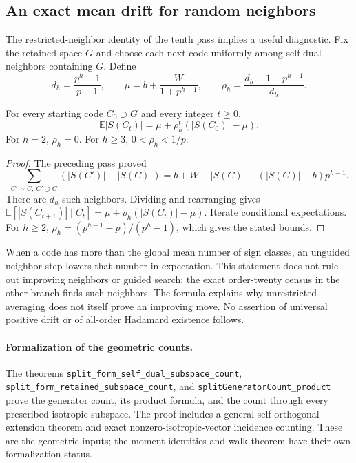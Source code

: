 \subsection{An exact mean drift for random neighbors}
The restricted-neighbor identity of the tenth pass implies a useful
diagnostic. Fix the retained space $G$ and choose each next code
uniformly among self-dual neighbors containing $G$. Define
\[
 d_h=\frac{p^h-1}{p-1},\qquad
 \mu=b+\frac{W}{1+p^{h-1}},\qquad
 \rho_h=\frac{d_h-1-p^{h-1}}{d_h}.
\]
\begin{proposition}
For every starting code $C_0\supset G$ and every integer $t\ge0$,
\[
 \mathbb E |S(C_t)|=\mu+\rho_h^t(|S(C_0)|-\mu).
\]
For $h=2$, $\rho_h=0$. For $h\ge3$, $0<\rho_h<1/p$.
\end{proposition}
\begin{proof}
The preceding pass proved
\[
 \sum_{C'\sim C,\ C'\supset G}(|S(C')|-|S(C)|)
 =b+W-|S(C)|-(|S(C)|-b)p^{h-1}.
\]
There are $d_h$ such neighbors. Dividing and rearranging gives
$\mathbb E[|S(C_{t+1})|\mid C_t]
=\mu+\rho_h(|S(C_t)|-\mu)$. Iterate conditional expectations.
For $h\ge2$,
$\rho_h=(p^{h-1}-p)/(p^h-1)$, which gives the stated bounds.
\end{proof}

When a code has more than the global mean number of sign classes,
an unguided neighbor step lowers that number in expectation.
This statement does not rule out improving neighbors or guided
search; the exact order-twenty census in the other branch finds
such neighbors. The formula explains why unrestricted averaging
does not itself prove an improving move. No assertion of universal
positive drift or of all-order Hadamard existence follows.

\paragraph{Formalization of the geometric counts.} The theorems \texttt{split\_\allowbreak form\_\allowbreak self\_\allowbreak dual\_\allowbreak subspace\_\allowbreak count}, \texttt{split\_\allowbreak form\_\allowbreak retained\_\allowbreak subspace\_\allowbreak count}, and \texttt{splitGeneratorCount\_\allowbreak product} prove the generator count, its product formula, and the count through every prescribed isotropic subspace. The proof includes a general self-orthogonal extension theorem and exact nonzero-isotropic-vector incidence counting. These are the geometric inputs; the moment identities and walk theorem have their own formalization status.

